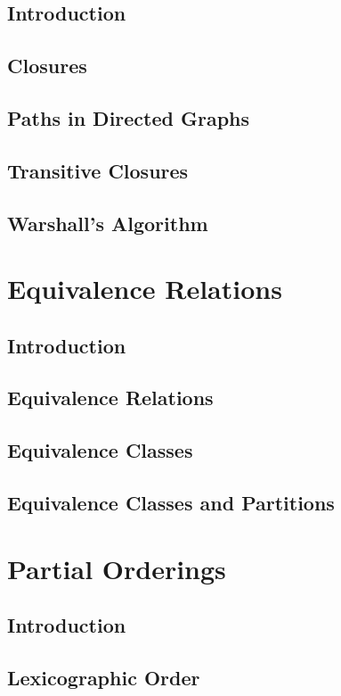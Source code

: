 \documentclass[11pt]{book}
\begin{document}
  \subsection{Introduction}
  \subsection{Closures}
  \subsection{Paths in Directed Graphs}
  \subsection{Transitive Closures}
  \subsection{Warshall's Algorithm}
  
 \section{Equivalence Relations}
  \subsection{Introduction}
  \subsection{Equivalence Relations}
  \subsection{Equivalence Classes}
  \subsection{Equivalence Classes and Partitions}
  
 \section{Partial Orderings}
  \subsection{Introduction}
  \subsection{Lexicographic Order}
\end{document}

